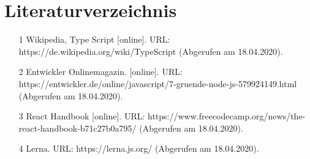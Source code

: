 \documentclass[11pt,a4paper,titlepage]{article}
\begin{document}
\section{Literaturverzeichnis}

\begin{itemize}
\item [1] Wikipedia, Type Script [online]. URL: https://de.wikipedia.org/wiki/TypeScript (Abgerufen am 18.04.2020).
\item [2] Entwickler Onlinemagazin.  [online]. URL: https://entwickler.de/online/javascript/7-gruende-node-js-579924149.html (Abgerufen am 18.04.2020).
\item [3] React Handbook [online]. URL: https://www.freecodecamp.org/news/the-react-handbook-b71c27b0a795/ (Abgerufen am 18.04.2020).
\item [4] Lerna. URL: https://lerna.js.org/ (Abgerufen am 18.04.2020).
\end{itemize}
\end{document}
